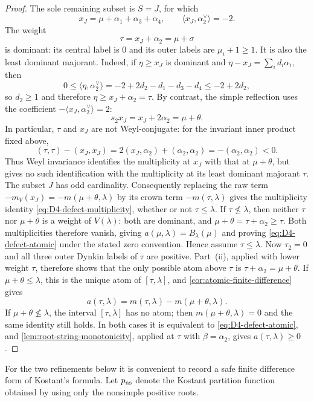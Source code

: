 \documentclass[11pt]{article}
\theoremstyle{definition}
\theoremstyle{remark}
\begin{document}
\begin{proof}
The sole remaining subset is $S=J$, for which
\[
 x_J=\mu+\alpha_1+\alpha_3+\alpha_4,
 \qquad
 \langle x_J,\alpha_2^\vee\rangle=-2.
\]
The weight
\[
 \tau=x_J+\alpha_2=\mu+\sigma
\]
is dominant: its central label is $0$ and its outer labels are
$\mu_i+1\ge1$.  It is also the least dominant majorant.  Indeed, if
$\eta\ge x_J$ is dominant and $\eta-x_J=\sum_i d_i\alpha_i$, then
\[
 0\le\langle\eta,\alpha_2^\vee\rangle
   =-2+2d_2-d_1-d_3-d_4\le -2+2d_2,
\]
so $d_2\ge1$ and therefore $\eta\ge x_J+\alpha_2=\tau$.  By contrast, the
simple reflection uses the coefficient
$-\langle x_J,\alpha_2^\vee\rangle=2$:
\[
 s_2x_J=x_J+2\alpha_2=\mu+\theta.
\]
In particular, $\tau$ and $x_J$ are not Weyl-conjugate: for the invariant
inner product fixed above,
\[
 (\tau,\tau)-(x_J,x_J)
   =2(x_J,\alpha_2)+(\alpha_2,\alpha_2)
   =-(\alpha_2,\alpha_2)<0.
\]
Thus Weyl invariance identifies the multiplicity at $x_J$ with that at
$\mu+\theta$, but gives no such identification with the multiplicity at
its least dominant majorant $\tau$.
The subset $J$ has odd cardinality.  Consequently replacing the raw term
$-m_V(x_J)=-m(\mu+\theta,\lambda)$ by its crown term
$-m(\tau,\lambda)$ gives the multiplicity identity
\eqref{eq:D4-defect-multiplicity}, whether or not $\tau\le\lambda$.
If $\tau\nleq\lambda$, then neither $\tau$ nor $\mu+\theta$ is a weight of
$V(\lambda)$: both are dominant, and $\mu+\theta=\tau+\alpha_2\ge\tau$.
Both multiplicities therefore vanish, giving $a(\mu,\lambda)=B_\lambda(\mu)$
and proving \eqref{eq:D4-defect-atomic} under the stated zero convention.
Hence assume $\tau\le\lambda$.  Now $\tau_2=0$ and all three outer Dynkin
labels of $\tau$ are positive.
Part~(ii), applied with lower weight $\tau$, therefore shows that the only
possible atom above $\tau$ is
$\tau+\alpha_2=\mu+\theta$.  If $\mu+\theta\le\lambda$, this is the
unique atom of $[\tau,\lambda]$, and \cref{cor:atomic-finite-difference} gives
\[
 a(\tau,\lambda)=m(\tau,\lambda)-m(\mu+\theta,\lambda).
\]
If $\mu+\theta\nleq\lambda$, the interval $[\tau,\lambda]$ has no atom;
then $m(\mu+\theta,\lambda)=0$ and the same identity still holds.  In both
cases it is equivalent to \eqref{eq:D4-defect-atomic}, and
\cref{lem:root-string-monotonicity}, applied at $\tau$ with
$\beta=\alpha_2$, gives $a(\tau,\lambda)\ge0$.
\end{proof}

For the two refinements below it is convenient to record a safe finite
difference form of Kostant's formula.  Let $p_{\rm ns}$ denote the Kostant
partition function obtained by using only the nonsimple positive roots.
\end{document}
